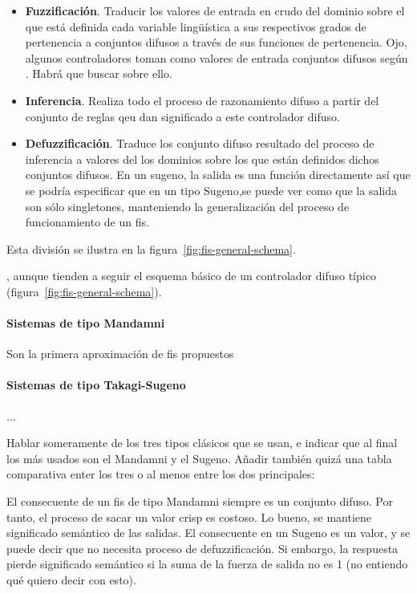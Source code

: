 \begin{itemize}
	\item \textbf{Fuzzificación}. Traducir los valores de entrada en crudo del dominio sobre el que está definida cada variable lingüística a sus respectivos grados de pertenencia a conjuntos difusos a través de sus funciones de pertenencia. \TODO Ojo, algunos controladores toman como valores de entrada conjuntos difusos según \cite{Ma2004}. Habrá que buscar sobre ello.
	\item \textbf{Inferencia}. Realiza todo el proceso de razonamiento difuso a partir del conjunto de reglas qeu dan significado a este controlador difuso.
	\item \textbf{Defuzzificación}. Traduce los conjunto difuso resultado del proceso de inferencia a valores del los dominios sobre los que están definidos dichos conjuntos difusos. \TODO En un sugeno, la salida es una función directamente así que se podría especificar que en un tipo Sugeno,se puede ver como que la salida son sólo singletones, manteniendo la generalización del proceso de funcionamiento de un \gls{fis}.
\end{itemize}

Esta división se ilustra en la figura~\ref{fig:fis-general-schema}.

, aunque tienden a seguir el esquema básico de un controlador difuso típico (figura~\ref{fig:fis-general-schema}).

\paragraph{Sistemas de tipo Mandamni}

Son la primera aproximación de \gls{fis} propuestos

\paragraph{Sistemas de tipo Takagi-Sugeno}

...

Hablar someramente de los tres tipos clásicos que se usan, e indicar que al final los más usados son el Mandamni y el Sugeno. Añadir también quizá una tabla comparativa enter los tres o al menos entre los dos principales:

El consecuente de un \gls{fis} de tipo Mandamni siempre es un conjunto difuso. Por tanto, el proceso de sacar un valor crisp es costoso. Lo bueno, se mantiene significado semántico de las salidas. El consecuente en un Sugeno es un valor, y se puede decir que no necesita proceso de defuzzificación. Si embargo, la respuesta pierde significado semántico si la suma de la fuerza de salida no es 1 (no entiendo qué quiero decir con esto).


